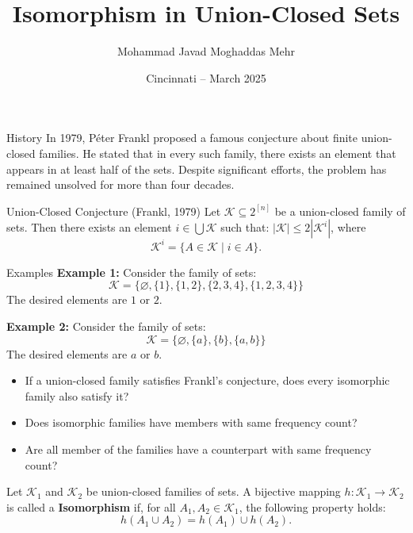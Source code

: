 \documentclass{beamer}
\title{Isomorphism in Union-Closed Sets}
\author{Mohammad Javad Moghaddas Mehr}
\date{Cincinnati – March 2025}
\begin{document}
\begin{frame}
	\titlepage
\end{frame}

\begin{frame}{History}
	In 1979, Péter Frankl proposed a famous conjecture about finite union-closed families.
	He stated that in every such family, there exists an element that appears in at least half of the sets.
	Despite significant efforts, the problem has remained unsolved for more than four decades.
	\vfill
	\vfill
	\begin{block}{Union-Closed Conjecture (Frankl, 1979)}
		Let \(\mathcal{K} \subseteq 2^{[n]}\) be a union-closed family of sets.
		Then there exists an element \(i \in \bigcup \mathcal{K}\) such that: \(|\mathcal{K}| \leq 2|\mathcal{K}^i|\),
		where
		\[
			\mathcal{K}^i = \{A \in \mathcal{K} \mid i \in A\}.
		\]
	\end{block}

\end{frame}


\begin{frame}{Examples}
	\textbf{Example 1:} Consider the family of sets:
	\[
		\mathcal{K} = \{\varnothing, \{1\}, \{1,2\}, \{2,3,4\}, \{1,2,3,4\}\}
	\]
	The desired elements are \(1\) or \(2\).


	\vfill

	\textbf{Example 2:} Consider the family of sets:
	\[
		\mathcal{K} = \{\varnothing, \{a\}, \{b\}, \{a,b\}\}
	\]
	The desired elements are \(a\) or \(b\).
\end{frame}




\begin{frame}
	\begin{itemize}
		\item 	If a union-closed family satisfies Frankl’s conjecture, does every isomorphic family also satisfy it?
		\item Does isomorphic families have members with same frequency count?
		\item Are all member of the families have a counterpart with same frequency count?

	\end{itemize}

	\vfill
	\begin{Definition}
		Let \( \mathcal{K}_1 \) and \( \mathcal{K}_2 \) be union-closed families of sets.
		A bijective mapping \( h: \mathcal{K}_1 \to \mathcal{K}_2 \) is called a \textbf{Isomorphism} if, for all
		\( A_1, A_2 \in \mathcal{K}_1 \), the following property holds:
		\[
			h(A_1 \cup A_2) = h(A_1) \cup h(A_2).
		\]
	\end{Definition}
\end{frame}
\end{document}
